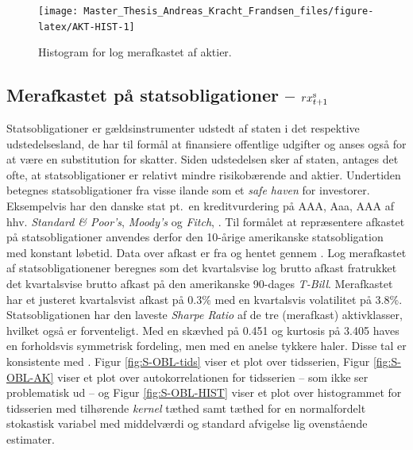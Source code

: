 \documentclass[
  a4paper,
  oneside]{memoir}
\begin{document}
\begin{figure}[H]

{\centering \texttt{[image: Master\_Thesis\_Andreas\_Kracht\_Frandsen\_files/figure-latex/AKT-HIST-1]} 

}

\caption{Histogram for log merafkastet af aktier.}\label{fig:AKT-HIST}
\end{figure}

\hypertarget{merafkastet-puxe5-statsobligationer-rx_t1textnormals}{%
\subsection{\texorpdfstring{Merafkastet på statsobligationer -- \(rx_{t+1}^{\textnormal{s}}\)}{Merafkastet på statsobligationer -- rx\_\{t+1\}\^{}\{\textbackslash textnormal\{s\}\}}}\label{merafkastet-puxe5-statsobligationer-rx_t1textnormals}}

Statsobligationer er gældsinstrumenter udstedt af staten i det respektive udstedelsesland, de har til formål at finansiere offentlige udgifter og anses også for at være en substitution for skatter. Siden udstedelsen sker af staten, antages det ofte, at statsobligationer er relativt mindre risikobærende and aktier. Undertiden betegnes statsobligationer fra visse ilande som et \emph{safe haven} for investorer. Eksempelvis har den danske stat pt.~en kreditvurdering på AAA, Aaa, AAA af hhv. \emph{Standard \& Poor's}, \emph{Moody's} og \emph{Fitch}, \citep{TradingEconomics2020}. Til formålet at repræsentere afkastet på statsobligationer anvendes derfor den 10-årige amerikanske statsobligation med konstant løbetid. Data over afkast er fra \citep{CRSPt90} og hentet gennem \citep{WRDSt90}. Log merafkastet af statsobligationener beregnes som det kvartalsvise log brutto afkast fratrukket det kvartalsvise brutto afkast på den amerikanske 90-dages \emph{T-Bill}. Merafkastet har et justeret kvartalsvist afkast på 0.3\(\%\) med en kvartalsvis volatilitet på 3.8\(\%\). Statsobligationen har den laveste \emph{Sharpe Ratio} af de tre (merafkast) aktivklasser, hvilket også er forventeligt. Med en skævhed på 0.451 og kurtosis på 3.405 haves en forholdsvis symmetrisk fordeling, men med en anelse tykkere haler. Disse tal er konsistente med \citep{CampVic2003}. Figur \ref{fig:S-OBL-tids} viser et plot over tidsserien, Figur \ref{fig:S-OBL-AK} viser et plot over autokorrelationen for tidsserien -- som ikke ser problematisk ud -- og Figur \ref{fig:S-OBL-HIST} viser et plot over histogrammet for tidsserien med tilhørende \emph{kernel} tæthed samt tæthed for en normalfordelt stokastisk variabel med middelværdi og standard afvigelse lig ovenstående estimater.
\end{document}
